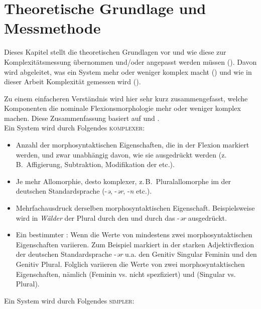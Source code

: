\chapter{Theoretische Grundlage und Messmethode}\label{4}

Dieses Kapitel stellt die theoretischen Grundlagen vor und wie diese zur Komplexitätsmessung übernommen und/oder angepasst werden müssen (). Davon wird abgeleitet, was ein System mehr oder weniger komplex macht () und wie in dieser Arbeit Komplexität gemessen wird ().

Zu einem einfacheren Verständnis wird hier sehr kurz zusammengefasst, welche Komponenten die nominale Flexionsmorphologie mehr oder weniger komplex machen. Diese Zusammenfassung basiert auf \citet[28]{BaechlerSeiler2012} und \citet[23]{Baechler2016}.\\

\noindent
Ein System wird durch Folgendes \textsc{komplexer}:

\begin{itemize}
\item 
Anzahl der morphosyntaktischen Eigenschaften, die in der Flexion markiert werden, und zwar unabhängig davon, wie sie ausgedrückt werden (z.\,B.\ Affigierung, Subtraktion, Modifikation der  etc.).
\item 
Je mehr Allomorphie, desto komplexer, z.\,B.\ Pluralallomorphe im  der deutschen Standardsprache (-\textit{ə}, -\textit{ər}, -\textit{n} etc.).
\item 
Mehrfachausdruck derselben morphosyntaktischen Eigenschaft. Beispielsweise wird in \textit{Wälder} der Plural durch den  und durch das  -\textit{ər} ausgedrückt.
\item 
Ein bestimmter : Wenn die Werte von mindestens zwei morphosyntaktischen Eigenschaften variieren. Zum Beispiel markiert in der starken Adjektivflexion der deutschen Standardsprache -\textit{ər} u.a. den Genitiv Singular Feminin und den Genitiv Plural. Folglich variieren die Werte von zwei morphosyntaktischen Eigenschaften, nämlich  (Feminin vs. nicht spezfiziert) und  (Singular vs. Plural).
\end{itemize}

\noindent\largerpage[2]
Ein System wird durch Folgendes \textsc{simpler}:

